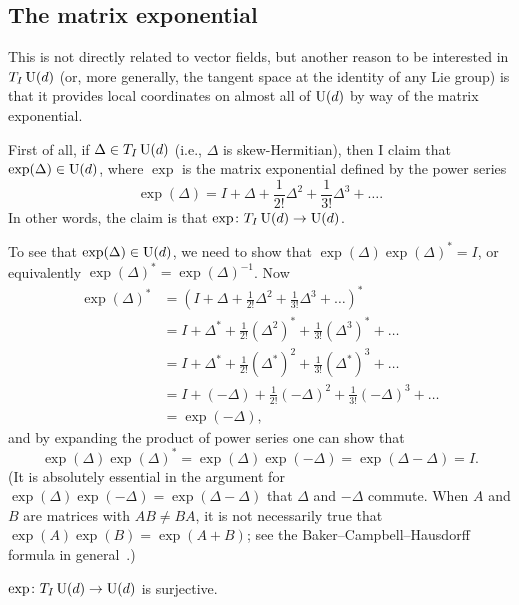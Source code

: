 	
	\subsection{The matrix exponential} 
	\label{sub:the_matrix_exponential}
	
	This is not directly related to vector fields, but another reason to be interested in $T_I \operatorname{U}(d)$ (or, more generally, the tangent space at the identity of any Lie group) is that it provides local coordinates on almost all of $\operatorname{U}(d)$ by way of the matrix exponential.
	
	
	First of all, if $\Delta \in T_I \operatorname{U}(d)$ (i.e., $\Delta$ is skew-Hermitian), then I claim that $\exp(\Delta) \in \operatorname{U}(d)$, where $\exp$ is the matrix exponential defined by the power series
	\[
		\exp(\Delta) = I + \Delta + \frac{1}{2!} \Delta^2 + \frac{1}{3!}\Delta^3 + \dots.
	\]
	In other words, the claim is that $\exp \colon\thinspace\! T_I\operatorname{U}(d) \to \operatorname{U}(d)$.
	
	To see that $\exp(\Delta) \in \operatorname{U}(d)$, we need to show that $\exp(\Delta)\exp(\Delta)^\ast = I$, or equivalently ${\exp(\Delta)^\ast = \exp(\Delta)^{-1}}$. Now
	\begin{align*}
		\exp(\Delta)^\ast & = \left( I + \Delta + \frac{1}{2!} \Delta^2 + \frac{1}{3!}\Delta^3 + \dots \right)^\ast \\
		& = I + \Delta^\ast + \frac{1}{2!} \left(\Delta^2\right)^\ast + \frac{1}{3!}\left(\Delta^3\right)^\ast+ \dots \\
		& = I + \Delta^\ast + \frac{1}{2!} \left(\Delta^\ast\right)^2 + \frac{1}{3!}\left(\Delta^\ast\right)^3 + \dots \\
		& = I + \left(-\Delta\right) + \frac{1}{2!} \left(-\Delta\right)^2 + \frac{1}{3!}\left(-\Delta\right)^3+ \dots \\
		& = \exp(-\Delta),
	\end{align*}
and by expanding the product of power series one can show that
\[
	\exp(\Delta)\exp(\Delta)^\ast = \exp(\Delta)\exp(-\Delta) = \exp(\Delta - \Delta) = I.
\]
(It is absolutely essential in the argument for $\exp(\Delta)\exp(-\Delta) = \exp(\Delta - \Delta)$ that $\Delta$ and $-\Delta$ commute. When $A$ and $B$ are matrices with $AB \neq BA$, it is not necessarily true that $\exp(A)\exp(B) = \exp(A+B)$; see the Baker--Campbell--Hausdorff formula in general~\cite[Chapter~5]{hallLieGroupsLie2015}.)

\begin{claim}
	$\exp \colon\thinspace\! T_I \operatorname{U}(d) \to \operatorname{U}(d)$ is surjective.
\end{claim}

